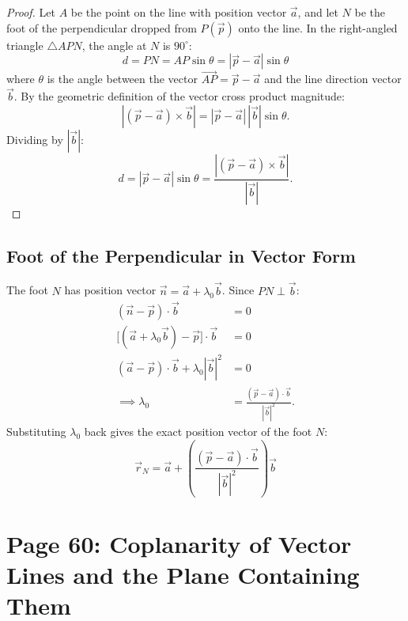 \begin{proof}
Let $A$ be the point on the line with position vector $\vec{a}$, and let $N$ be the foot of the perpendicular dropped from $P(\vec{p})$ onto the line.
In the right-angled triangle $\triangle APN$, the angle at $N$ is $90^\circ$:
\begin{equation}
    d = PN = AP\sin\theta = |\vec{p} - \vec{a}|\sin\theta
\end{equation}
where $\theta$ is the angle between the vector $\vec{AP} = \vec{p} - \vec{a}$ and the line direction vector $\vec{b}$.
By the geometric definition of the vector cross product magnitude:
\begin{equation}
    |(\vec{p} - \vec{a}) \times \vec{b}| = |\vec{p} - \vec{a}|\,|\vec{b}|\sin\theta.
\end{equation}
Dividing by $|\vec{b}|$:
\begin{equation}
    d = |\vec{p} - \vec{a}|\sin\theta = \frac{|(\vec{p} - \vec{a}) \times \vec{b}|}{|\vec{b}|}.
\end{equation}
\end{proof}

\subsection{Foot of the Perpendicular in Vector Form}
The foot $N$ has position vector $\vec{n} = \vec{a} + \lambda_0 \vec{b}$.
Since $PN \perp \vec{b}$:
\begin{align}
    (\vec{n} - \vec{p}) \cdot \vec{b} &= 0 \nonumber\\
    \bigl[(\vec{a} + \lambda_0 \vec{b}) - \vec{p}\bigr] \cdot \vec{b} &= 0 \nonumber\\
    (\vec{a} - \vec{p}) \cdot \vec{b} + \lambda_0 |\vec{b}|^2 &= 0 \nonumber\\
    \implies \lambda_0 &= \frac{(\vec{p} - \vec{a}) \cdot \vec{b}}{|\vec{b}|^2}.
\end{align}
Substituting $\lambda_0$ back gives the exact position vector of the foot $N$:
\begin{equation}
    \boxed{\vec{r}_N = \vec{a} + \left( \frac{(\vec{p} - \vec{a}) \cdot \vec{b}}{|\vec{b}|^2} \right)\vec{b}}
\end{equation}

\section{Page 60: Coplanarity of Vector Lines and the Plane Containing Them}
\label{sec:page60}

